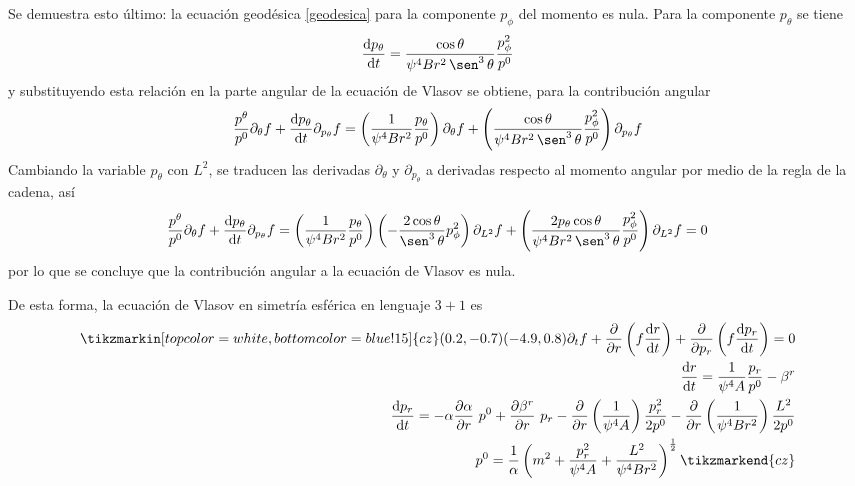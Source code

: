 \documentclass[11pt,twoside,openright,spanish]{report}
\numberwithin{equation}{chapter}
\numberwithin{figure}{chapter}
\numberwithin{table}{chapter}
\renewcommand{\sin}{\operatorname{\sen}}
\begin{document}
Se demuestra esto último: la ecuación geodésica \eqref{geodesica} para la componente $p_\phi$ del momento es nula. Para la componente $p_\theta$ se tiene
\begin{equation}
\frac{\text{d}p_\theta}{\text{d}t}=\frac{\cos\theta}{\psi^4Br^2\sin^3\theta}\frac{p_\phi^2}{p^0}
\end{equation}
y substituyendo esta relación en la parte angular de la ecuación de Vlasov se obtiene, para la contribución angular
\begin{equation}
\frac{p^\theta}{p^0}\partial_\theta f+\frac{\text{d}p_\theta}{\text{d}t}\partial_{p_\theta}f=\left(\frac{1}{\psi^4Br^2}\frac{p_\theta}{p^0}\right)\partial_\theta f+\left(\frac{\cos\theta}{\psi^4Br^2\sin^3\theta}\frac{p_\phi^2}{p^0}\right)\partial_{p_\theta}f
\end{equation}
Cambiando la variable $p_\theta$ con $L^2$, se traducen las derivadas $\partial_\theta$ y $\partial_{p_\theta}$ a derivadas respecto al momento angular por medio de la regla de la cadena, así
\begin{equation}
\nonumber
\frac{p^\theta}{p^0}\partial_\theta f+\frac{\text{d}p_\theta}{\text{d}t}\partial_{p_\theta}f=\left(\frac{1}{\psi^4Br^2}\frac{p_\theta}{p^0}\right)\left(-\frac{2\cos\theta}{\sin^3\theta}p_\phi^2\right)\partial_{L^2}f+\left(\frac{2p_\theta\cos\theta}{\psi^4Br^2\sin^3\theta}\frac{p_\phi^2}{p^0}\right)\partial_{L^2}f=0
\end{equation}
por lo que se concluye que la contribución angular a la ecuación de Vlasov es nula.

De esta forma, la ecuación de Vlasov en simetría esférica en lenguaje $3+1$ es
\begin{subequations}
	\begin{align}
	\tikzmarkin[top color=white, bottom color=blue!15]{cz}(0.2,-0.7)(-4.9,0.8)
	\partial_tf+\frac{\partial}{\partial r}\left(f\frac{\text{d}r}{\text{d}t} \right)+\frac{\partial}{\partial p_r}\left(f\frac{\text{d}p_r}{\text{d}t}\right)=0\label{vlasovsimesferica1}\\
	\frac{\text{d}r}{\text{d}t}=\frac{1}{\psi^4A}\frac{p_r}{p^0}-\beta^r\label{velr}\\
	\frac{\text{d}p_r}{\text{d}t}=-\alpha\frac{\partial\alpha}{\partial r}\ p^0+\frac{\partial\beta^r}{\partial r}\ p_r-\frac{\partial}{\partial r}\left(\frac{1}{\psi^4A}\right)\frac{p^2_r}{2p^0}-\frac{\partial}{\partial r}\left(\frac{1}{\psi^4Br^2}\right)\frac{L^2}{2p^0}\label{velpr}\\	p^0=\frac{1}{\alpha}\left(m^2+\frac{p_r^2}{\psi^4A}+\frac{L^2}{\psi^4Br^2}\right)^{\frac{1}{2}}
	\tikzmarkend{cz}
	\end{align}\label{vlasovsimesferica}
\end{subequations}
\end{document}
